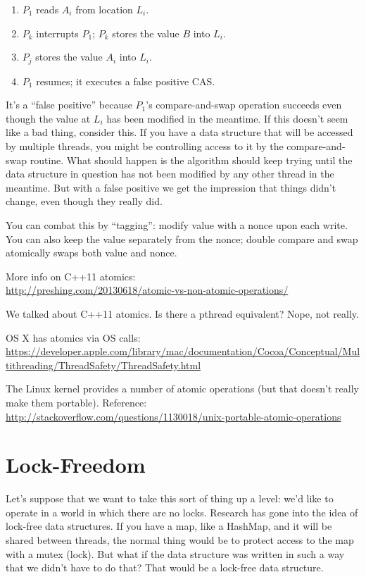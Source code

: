 \begin{enumerate}
	\item $P_{1}$ reads $A_{i}$ from location $L_{i}$.
	\item $P_{k}$ interrupts $P_{1}$; $P_{k}$ stores the value $B$ into $L_{i}$.
	\item $P_{j}$ stores the value $A_{i}$ into $L_{i}$.
	\item $P_{1}$ resumes; it executes a false positive CAS.
\end{enumerate} 

It's a ``false positive'' because $P_{1}$'s compare-and-swap operation succeeds even though the value at $L_{i}$ has been modified in the meantime. If this doesn't seem like a bad thing, consider this. If you have a data structure that will be accessed by multiple threads, you might be controlling access to it by the compare-and-swap routine. What should happen is the algorithm should keep trying until the data structure in question has not been modified by any other thread in the meantime. But with a false positive we get the impression that things didn't change, even though they really did.

You can combat this by ``tagging'': modify value with a nonce upon each
write.  You can also keep the value separately from the nonce; double
compare and swap atomically swaps both value and nonce.


More info on C++11 atomics:\\
\url{http://preshing.com/20130618/atomic-vs-non-atomic-operations/}

We talked about C++11 atomics. Is there a pthread equivalent? Nope, not really.

OS X has atomics via OS calls: \\
\url{https://developer.apple.com/library/mac/documentation/Cocoa/Conceptual/Multithreading/ThreadSafety/ThreadSafety.html}

The Linux kernel provides a number of atomic operations (but that doesn't really make them portable). Reference:
\url{http://stackoverflow.com/questions/1130018/unix-portable-atomic-operations}

\section*{Lock-Freedom}

Let's suppose that we want to take this sort of thing up a level: we'd like to operate in a world in which there are no locks. Research has gone into the idea of lock-free data structures. If you have a map, like a HashMap, and it will be shared between threads, the normal thing would be to protect access to the map with a mutex (lock). But what if the data structure was written in such a way that we didn't have to do that? That would be a lock-free data structure.

